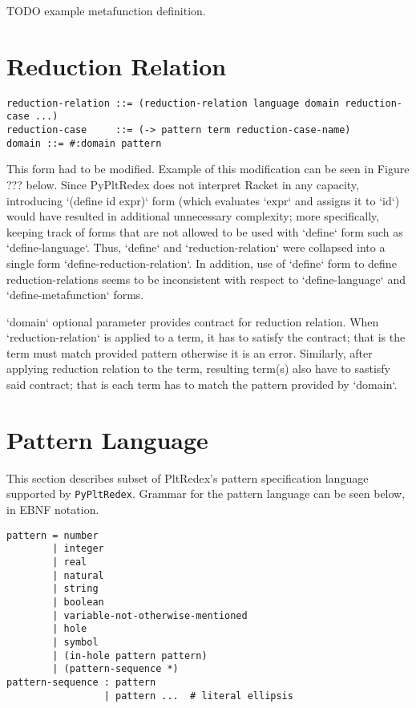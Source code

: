 TODO example metafunction definition.

\section{Reduction Relation}

\begin{lstlisting}
reduction-relation ::= (reduction-relation language domain reduction-case ...)
reduction-case     ::= (-> pattern term reduction-case-name)
domain ::= #:domain pattern
\end{lstlisting}

This form had to be modified. Example of this modification can be seen in Figure ??? below. Since PyPltRedex does not interpret Racket in any capacity, introducing `(define id expr)` form (which evaluates `expr` and assigns it to `id`) would have resulted in additional unnecessary complexity; more specifically, keeping track of forms that are not allowed to be used with `define` form such as `define-language`. Thus, `define` and `reduction-relation` were collapsed into a single form `define-reduction-relation`. In addition, use of `define` form to define reduction-relations seems to be inconsistent with respect to `define-language` and `define-metafunction` forms.


`domain` optional parameter provides contract for reduction relation. When `reduction-relation` is applied to a term, it has to satisfy the contract; that is the term must match provided pattern otherwise it is an error. Similarly, after applying reduction relation to the term, resulting term(s) also have to sastisfy said contract; that is each term has to match the pattern provided by `domain`.

\section{Pattern Language}

This section describes subset of PltRedex's pattern specification language supported by \texttt{PyPltRedex}. Grammar for the pattern language can be seen below, in EBNF notation. 

\begin{lstlisting}
pattern = number 
        | integer 
		| real 
		| natural 
		| string 
		| boolean 
		| variable-not-otherwise-mentioned 
		| hole 
		| symbol
        | (in-hole pattern pattern)
        | (pattern-sequence *) 
pattern-sequence : pattern 
                 | pattern ...  # literal ellipsis
\end{lstlisting}

